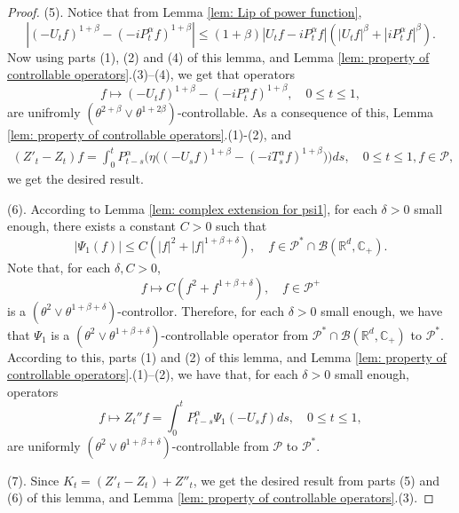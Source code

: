\documentclass[12pt,a4paper]{amsart}
\theoremstyle{plain}
\theoremstyle{definition}
\numberwithin{equation}{section}
\begin{document}
\begin{proof}
    (5). Notice that from Lemma \ref{lem: Lip of power function},
\[
    |(-U_t f)^{1+\beta} - (-iP^\alpha_t f)^{1+\beta} |
    \leq  (1+\beta) |U_t f-iP^\alpha_t f|(|U_t f|^{\beta}+|i P^\alpha_t f|^{\beta}).
\]
    Now using parts (1), (2) and  (4) of this lemma, and Lemma \ref{lem: property of controllable operators}.(3)--(4), we get that operators
\[
    f \mapsto (-U_t f)^{1+\beta} - (-iP^\alpha_t f)^{1+\beta},\quad 0\leq t\leq 1,
\]
    are unifromly $(\theta^{2+\beta}\vee \theta^{1+2\beta})$-controllable.
    As a consequence of this, Lemma \ref{lem: property of controllable operators}.(1)-(2), and
\begin{equation}\begin{split}
    (Z'_t - Z_t)f = \int_0^t P^\alpha_{t-s}\Big( \eta \big((-U_s f)^{1+\beta} - (-iT_s^\alpha f)^{1+\beta} \big)\Big)ds,
    \quad 0\leq t\leq 1, f\in \mathcal P,
\end{split}\end{equation}
    we get the desired result.

    (6). %
    According to Lemma \ref{lem: complex extension for psi1}, for each $\delta > 0$ small enough, there exists a constant $C>0$ such that
\[
    |\Psi_1(f)|
    \le C(|f|^2+|f|^{1+\beta+ \delta}),
    \quad f\in \mathcal P^*\cap\mathcal B(\mathbb R^d, \mathbb C_+).
\]
    Note that, for each $\delta, C>0$,
\[
    f\mapsto C(f^2+f^{1+\beta+\delta}),
    \quad f\in \mathcal P^+
\]
    is a $(\theta^2 \vee \theta^{1+\beta+\delta})$-controllor. 
    Therefore, for each $\delta > 0$ small enough, we have that $\Psi_1$ is a $(\theta^2 \vee \theta^{1+\beta+\delta})$-controllable operator from $\mathcal P^*\cap\mathcal B(\mathbb R^d, \mathbb C_+)$ to $\mathcal P^*$.
    According to this, parts (1) and (2) of this lemma, and Lemma \ref{lem: property of controllable operators}.(1)--(2), we have that, for each $\delta > 0$ small enough, operators
\[
    f
    \mapsto Z_t'' f
    = \int_0^t P_{t-s}^\alpha \Psi_1(-U_sf)ds,
    \quad 0\leq t\leq 1,
\]
    are uniformly $(\theta^2 \vee \theta^{1+\beta+\delta})$-controllable from $\mathcal P$ to $\mathcal P^*$.

    (7). Since $K_t = (Z'_t-Z_t)+Z''_t$, we get the desired result from parts (5) and  (6) of this lemma,  and Lemma \ref{lem: property of controllable operators}.(3).
\end{proof}
\end{document}
